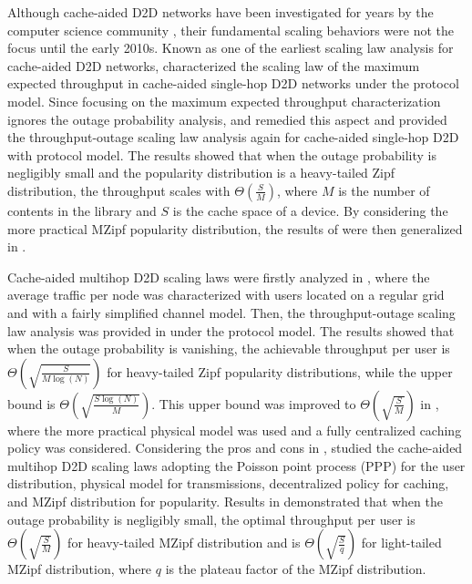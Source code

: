 \documentclass[journal,draftclsnofoot,onecolumn,12pt,twoside]{IEEEtran}
\begin{document}
Although cache-aided D2D networks have been investigated for years by the computer science community \cite{hara2001effective,cohen2002replication,hara2006data,zhao2010cooperative}, their fundamental scaling behaviors were not the focus until the early 2010s. Known as one of the earliest scaling law analysis for cache-aided D2D networks, \cite{Golrezaei:Cach_scale} characterized the scaling law of the maximum expected throughput in cache-aided single-hop D2D networks under the protocol model. Since focusing on the maximum expected throughput characterization ignores the outage probability analysis, \cite{ji2013fundamental} and \cite{Ji:Th_Out_toff} remedied this aspect and provided the throughput-outage scaling law analysis again for cache-aided single-hop D2D with protocol model. The results showed that when the outage probability is negligibly small and the popularity distribution is a heavy-tailed Zipf distribution, the throughput scales with $\Theta\left(\frac{S}{M}\right)$, where $M$ is the number of contents in the library and $S$ is the cache space of a device. By considering the more practical MZipf popularity distribution, the results of \cite{Ji:Th_Out_toff} were then generalized in \cite{lee2019throughput}.

Cache-aided multihop D2D scaling laws were firstly analyzed in \cite{gitzenis2012asymptotic}, where the average traffic per node was characterized with users located on a regular grid and with a fairly simplified channel model. Then, the throughput-outage scaling law analysis was provided in \cite{jeon2017wireless} under the protocol model. The results showed that when the outage probability is vanishing, the achievable throughput per user is $\Theta\left(\sqrt{\frac{S}{M\log(N)}}\right)$ for heavy-tailed Zipf popularity distributions, while the upper bound is $\Theta\left(\sqrt{\frac{S\log(N)}{M}}\right)$. This upper bound was improved to $\Theta\left(\sqrt{\frac{S}{M}}\right)$ in \cite{qiu2019popularity}, where the more practical physical model was used and a fully centralized caching policy was considered. Considering the pros and cons in \cite{gitzenis2012asymptotic,jeon2017wireless,qiu2019popularity}, \cite{lee2020optimal} studied the cache-aided multihop D2D scaling laws adopting the Poisson point process (PPP) for the user distribution, physical model for transmissions, decentralized policy for caching, and MZipf distribution for popularity. Results in \cite{lee2020optimal} demonstrated that when the outage probability is negligibly small, the optimal throughput per user is $\Theta\left(\sqrt{\frac{S}{M}}\right)$ for heavy-tailed MZipf distribution and is $\Theta\left(\sqrt{\frac{S}{q}}\right)$ for light-tailed MZipf distribution, where $q$ is the plateau factor of the MZipf distribution.
\end{document}
